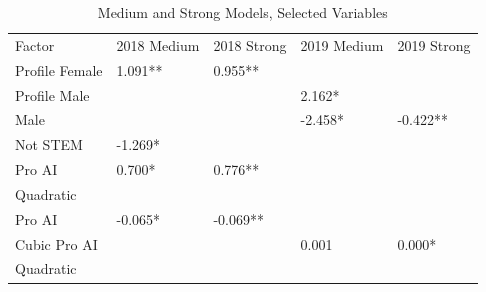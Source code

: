 \documentclass[AER]{./aea-latex-templates/AEA}
\begin{document}
        \begin{table}
            \caption{Medium and Strong Models, Selected Variables}
            \begin{tabular}{lllll}
            Factor & 2018 Medium & 2018 Strong & 2019 Medium & 2019 Strong \\
            Profile Female & 1.091** & 0.955** \\ %
            Profile Male &  &  & 2.162* &  \\ %
            Male &  &  & -2.458* & -0.422** \\
            Not STEM & -1.269* \\ %
            Pro AI & 0.700* & 0.776** \\ %
            Quadratic
            \\Pro AI & -0.065* & -0.069** \\ %
            Cubic Pro AI &  &  & 0.001 & 0.000* \\ %
            Quadratic

\end{tabular}
\end{table}
\end{document}
